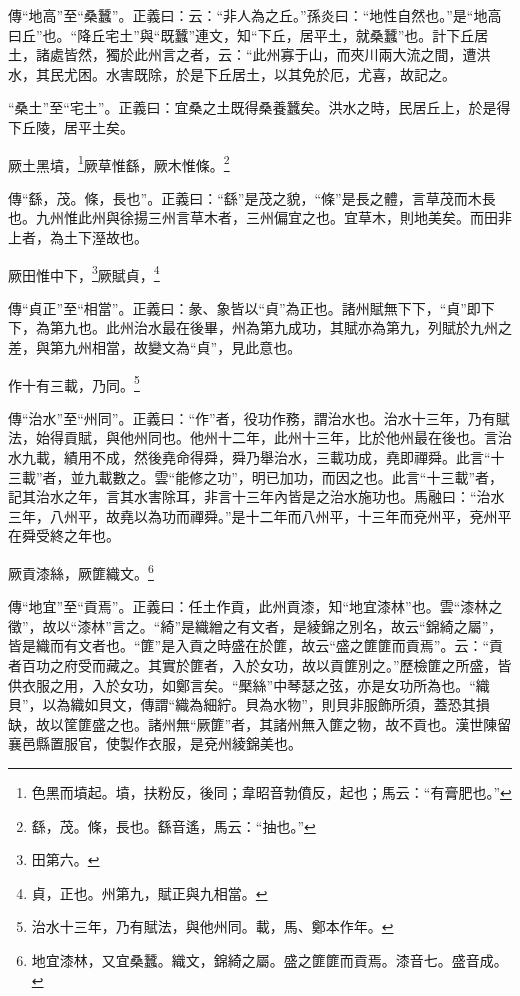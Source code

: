 {\noindent\zhuan{}\fzbyks 傳“地高”至“桑蠶”。正義曰：云：“非人為之丘。”孫炎曰：“地性自然也。”是“地高曰丘”也。“降丘宅土”與“既蠶”連文，知“下丘，居平土，就桑蠶”也。計下丘居土，諸處皆然，獨於此州言之者，云：“此州寡于山，而夾川兩大流之間，遭洪水，其民尤困。水害既除，於是下丘居土，以其免於厄，尤喜，故記之。 \par}

{\noindent\shu{}\fzkt “桑土”至“宅土”。正義曰：宜桑之土既得桑養蠶矣。洪水之時，民居丘上，於是得下丘陵，居平土矣。 \par}

厥土黑墳，\footnote{色黑而墳起。墳，扶粉反，後同；韋昭音勃僨反，起也；馬云：“有膏肥也。”}厥草惟繇，厥木惟條。\footnote{繇，茂。條，長也。繇音遙，馬云：“抽也。”}

{\noindent\zhuan{}\fzbyks 傳“繇，茂。條，長也”。正義曰：“繇”是茂之貌，“條”是長之體，言草茂而木長也。九州惟此州與徐揚三州言草木者，三州偏宜之也。宜草木，則地美矣。而田非上者，為土下溼故也。 \par}

厥田惟中下，\footnote{田第六。}厥賦貞，\footnote{貞，正也。州第九，賦正與九相當。}

{\noindent\zhuan{}\fzbyks 傳“貞正”至“相當”。正義曰：彖、象皆以“貞”為正也。諸州賦無下下，“貞”即下下，為第九也。此州治水最在後畢，州為第九成功，其賦亦為第九，列賦於九州之差，與第九州相當，故變文為“貞”，見此意也。 \par}

作十有三載，乃同。\footnote{治水十三年，乃有賦法，與他州同。載，馬、鄭本作年。}

{\noindent\zhuan{}\fzbyks 傳“治水”至“州同”。正義曰：“作”者，役功作務，謂治水也。治水十三年，乃有賦法，始得貢賦，與他州同也。他州十二年，此州十三年，比於他州最在後也。言治水九載，績用不成，然後堯命得舜，舜乃舉治水，三載功成，堯即禪舜。此言“十三載”者，並九載數之。雲“能修之功”，明已加功，而因之也。此言“十三載”者，記其治水之年，言其水害除耳，非言十三年內皆是之治水施功也。馬融曰：“治水三年，八州平，故堯以為功而禪舜。”是十二年而八州平，十三年而兗州平，兗州平在舜受終之年也。 \par}

厥貢漆絲，厥篚織文。\footnote{地宜漆林，又宜桑蠶。織文，錦綺之屬。盛之篚篚而貢焉。漆音七。盛音成。}

{\noindent\zhuan{}\fzbyks 傳“地宜”至“貢焉”。正義曰：任土作貢，此州貢漆，知“地宜漆林”也。雲“漆林之徵”，故以“漆林”言之。“綺”是織繒之有文者，是綾錦之別名，故云“錦綺之屬”，皆是織而有文者也。“篚”是入貢之時盛在於篚，故云“盛之篚篚而貢焉”。云：“貢者百功之府受而藏之。其實於篚者，入於女功，故以貢篚別之。”歷檢篚之所盛，皆供衣服之用，入於女功，如鄭言矣。“檿絲”中琴瑟之弦，亦是女功所為也。“織貝”，以為織如貝文，傳謂“織為細紵。貝為水物”，則貝非服飾所須，蓋恐其損缺，故以筐篚盛之也。諸州無“厥篚”者，其諸州無入篚之物，故不貢也。漢世陳留襄邑縣置服官，使製作衣服，是兗州綾錦美也。 \par}

